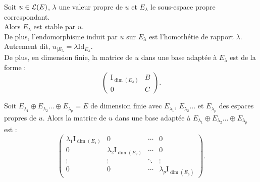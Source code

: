 \documentclass[a4paper]{book}
\begin{document}
\begin{Proposition}
Soit $u\in \mathcal{L}(E)$, $\lambda    $ une valeur propre de $u$ et $E_\lambda    $ le sous-espace propre correspondant.\\
Alors $E_\lambda    $ est stable par $u$.\\
De plus, l'endomorphisme induit par $u$ sur $E_\lambda    $ est l'homothétie de rapport $\lambda    $.
Autrement dit, $u_{\vert E_\lambda    } =\lambda    \mathrm{Id}_{E_\lambda    }$.\\
De plus, en dimension finie, la matrice de $u$ dans une base adaptée à $E_\lambda    $ est de la forme :
$$\begin{pmatrix}
\mathrm{I}_{\dim(E_\lambda)} & B \\ 0 & C
\end{pmatrix}.$$ 
\end{Proposition}
\begin{Proposition}[Diagonalisation] Soit $E_{\lambda_1}\oplus E_{\lambda_2}\dots \oplus E_{\lambda_p}  =E$ de dimension finie avec $E_{\lambda_1}$, $E_{\lambda_2}\dots$ et $E_{\lambda_p}$  des espaces propres de $u$. Alors la matrice de $u$ dans une base adaptée à $E_{\lambda_1}\oplus E_{\lambda_2}\dots \oplus E_{\lambda_p}$ est :
$$ \begin{pmatrix}\lambda_1 \mathrm {I}_{\dim(E_1)}&\mathrm {0}&\cdots &\mathrm {0}\\\mathrm {0}&\lambda_2 \mathrm {I}_{\dim(E_2)}&\cdots &\mathrm {0}\\\vdots &\vdots &\ddots &\vdots \\\mathrm {0}&\mathrm {0}&\cdots &\lambda_p \mathrm {I}_{\dim(E_p)}\end{pmatrix}.$$
\end{Proposition}
\end{document}
